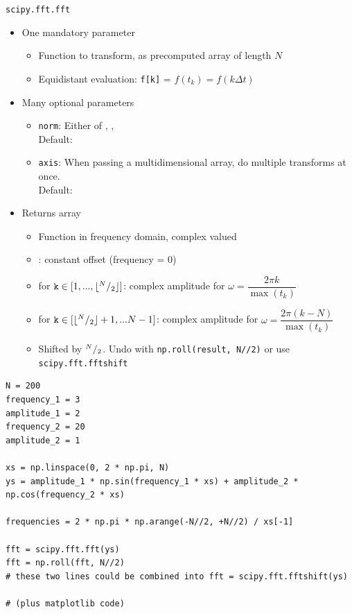 \begin{frame}{\texttt{scipy.fft.fft}}
%
\begin{itemize}
\item One mandatory parameter
	\begin{itemize}
	\item Function to transform, as precomputed array of length $N$
	\item Equidistant evaluation: \texttt{f[k]} = $f(t_k) = f(k \Delta t)$
	\end{itemize}
\item Many optional parameters
	\begin{itemize}
	\item \texttt{norm}: Either of , , \\
		Default: 
	\item \texttt{axis}: When passing a multidimensional array, do multiple transforms at once.\\
		Default: 
	\end{itemize}
\item Returns array
	\begin{itemize}
	\item Function in frequency domain, complex valued
	\item {}: constant offset (frequency = 0)
	\item {} for $\texttt{k} \in [1, ..., \lfloor {}^{N}/_{2} \rfloor]$: complex amplitude for $\omega = \dfrac{2\pi k}{\max(t_k)}$
	\item {} for $\texttt{k} \in [\lfloor {}^{N}/_{2} \rfloor + 1, ... N -1]$: complex amplitude for $\omega = \dfrac{2\pi (k-N)}{\max(t_k)}$
	\item[\Thus] Shifted by ${}^{N}/_{2}$. Undo with \texttt{np.roll(result, N//2)} or use \texttt{scipy.fft.fftshift}
	\end{itemize}
\end{itemize}
%
\end{frame}


\begin{frame}[fragile]
%
\begin{codebox}
\begin{verbatim}
N = 200
frequency_1 = 3
amplitude_1 = 2
frequency_2 = 20
amplitude_2 = 1

xs = np.linspace(0, 2 * np.pi, N)
ys = amplitude_1 * np.sin(frequency_1 * xs) + amplitude_2 * np.cos(frequency_2 * xs)

frequencies = 2 * np.pi * np.arange(-N//2, +N//2) / xs[-1]

fft = scipy.fft.fft(ys)
fft = np.roll(fft, N//2)
# these two lines could be combined into fft = scipy.fft.fftshift(ys)

# (plus matplotlib code)
\end{verbatim}
\end{codebox}
%
\end{frame}

